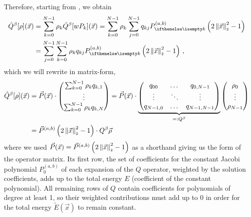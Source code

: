 Therefore, starting from , we obtain
\begin{align*}
  \hat{Q}^\beta[\rho](\vec{x}) & = \sum_{k=0}^{N-1} \rho_k \hat{Q}^\beta[wP_k](\vec{x}) = \sum_{k=0}^{N-1} \rho_k \sum_{j=0}^{N-1} q_{kj} \jacobi{x} \\
                               & = \sum_{j=0}^{N-1} \sum_{k=0}^{N-1} \rho_k q_{kj} \jacobi{x}\,,
\end{align*}
which we will rewrite in matrix-form,
\begin{align*}
  \hat{Q}^\beta[\rho](\vec{x}) & = \vec{P}(\vec{x}) \cdot
  \begin{pmatrix}
    \sum_{k=0}^{N-1} \rho_k q_{k,1} \\
    \vdots                          \\
    \sum_{k=0}^{N-1} \rho_k q_{k,N}
  \end{pmatrix} = \vec{P}(\vec{x}) \cdot
  \underbrace{
    \begin{pmatrix}
      q_{00}    & \dots  & q_{0,N-1}   \\
      \vdots    & \ddots & \vdots      \\
      q_{N-1,0} & \dots  & q_{N-1,N-1} \\
    \end{pmatrix}
  }_{=: Q^\beta}
  \begin{pmatrix}
    \rho_0 \\
    \vdots \\
    \rho_{N-1}
  \end{pmatrix}                                                          \\
                               & = \vec{P}^{(a, b)}\left(2 \left\lVert\vec{x}\right\rVert_{\scriptscriptstyle 2}^2 - 1\right) \cdot Q^\beta \vec{\rho}
\end{align*}
where we used $\vec{P}(\vec{x}) = \vec{P}^{(a, b)}\left(2 \left\lVert\vec{x}\right\rVert_{\scriptscriptstyle 2}^2 - 1\right)$ as a shorthand giving us the form of the operator matrix.
Its first row, the set of coefficients for the constant Jacobi polynomial $P_0^{(a,b)}$ of each expansion of the $Q$ operator, weighted by the solution coefficients, adds up to the total energy $E$ (coefficient of the constant polynomial).
All remaining rows of $Q$ contain coefficients for polynomials of degree at least 1, so their weighted contributions must add up to 0 in order for the total energy $\tilde{E}(\vec{x})$ to remain constant.
